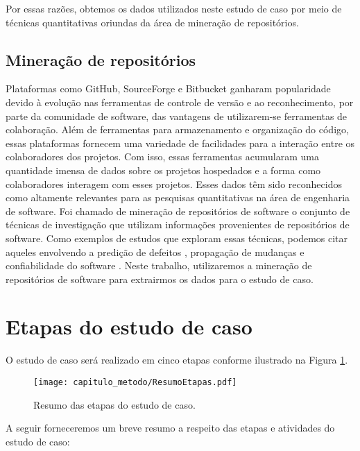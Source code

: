 Por essas razões, obtemos os dados utilizados neste estudo de caso por meio de técnicas quantitativas oriundas da área de mineração de repositórios.

\subsection{Mineração de repositórios}

Plataformas como GitHub, SourceForge e Bitbucket ganharam popularidade devido à evolução nas ferramentas de controle de versão e ao reconhecimento, por parte da comunidade de software,  das vantagens de utilizarem-se ferramentas de colaboração. Além de ferramentas para armazenamento e organização do código, essas plataformas fornecem uma variedade de facilidades para a interação entre os colaboradores dos projetos. Com isso, essas ferramentas acumularam uma quantidade imensa de dados sobre os projetos hospedados e a forma como colaboradores interagem com esses projetos. Esses dados têm sido reconhecidos como altamente relevantes para as pesquisas quantitativas na área de engenharia de software. Foi chamado de mineração de repositórios de software \cite{bai2008mining} o conjunto de técnicas de investigação que utilizam informações provenientes de repositórios de software. Como exemplos de estudos que exploram essas técnicas, podemos citar aqueles envolvendo a predição de defeitos \cite{wang2014software}, propagação de mudanças \cite{wiese2015predicting} e confiabilidade do software \cite{de2015software}. Neste trabalho, utilizaremos a mineração de repositórios de software para extrairmos os dados para o estudo de caso. 


\section{Etapas do estudo de caso}

O estudo de caso será realizado em cinco etapas conforme ilustrado na Figura \ref{fig:cap_metodo_resumo_etapas}.  






  \begin{figure}[H]
  \centering
  \texttt{[image: capitulo\_metodo/ResumoEtapas.pdf]} 
  \caption{Resumo das etapas do estudo de caso. }
  \label{fig:cap_metodo_resumo_etapas} 
\end{figure}

A seguir forneceremos um breve resumo a respeito das etapas e atividades do estudo de caso:

